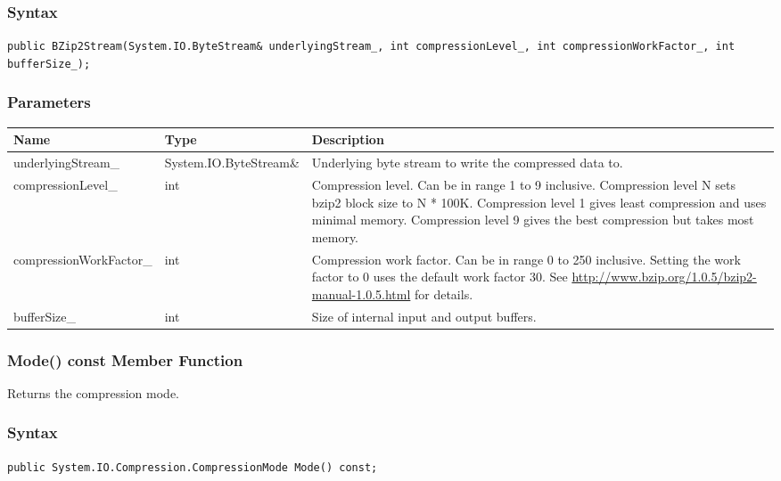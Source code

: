 \documentclass[a4paper,oneside,11.000000pt]{book}
\begin{document}
\subsubsection*{Syntax}
\texttt{public BZip2Stream(System.IO.ByteStream\& underlyingStream\_, int compressionLevel\_, int compressionWorkFactor\_, int bufferSize\_);}
\subsubsection*{Parameters}
\begin{flushleft}
\begin{supertabular}[l]{!{\raggedright}p{4.93333cm}!{\raggedright}p{4.93333cm}!{\raggedright}p{4.93333cm}}
\textbf{Name}
& \textbf{Type}
& \textbf{Description}
\\
\hline
underlyingStream\_
& System.\-IO.\-ByteStream\&\-
& Underlying byte stream to write the compressed data to.

\\
compressionLevel\_
& int
& Compression level. Can be in range 1 to 9 inclusive. Compression level N sets bzip2 block size to N * 100K. 
Compression level 1 gives least compression and uses minimal memory.
Compression level 9 gives the best compression but takes most memory.

\\
compressionWorkFactor\_
& int
& Compression work factor. Can be in range 0 to 250 inclusive. Setting the work factor to 0 uses the default work factor 30.
See \url{http://www.bzip.org/1.0.5/bzip2-manual-1.0.5.html} for details.

\\
bufferSize\_
& int
& Size of internal input and output buffers.

\\
\end{supertabular}

\end{flushleft}
\clearpage

\hypertarget{System.IO.Compression.BZip2Stream.Mode.C.P.System.IO.Compression.BZip2Stream}{\subsubsection*{Mode() const Member Function}}\begin{flushleft}
Returns the compression mode.

\end{flushleft}

\subsubsection*{Syntax}\texttt{public System.IO.Compression.CompressionMode Mode() const;}
\end{document}

